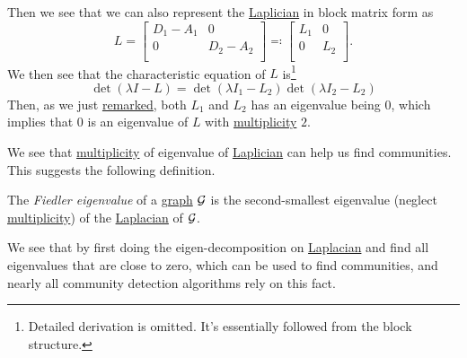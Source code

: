 Then we see that we can also represent the \hyperref[def:Laplician]{Laplician} in block matrix form as
\[
	L = \begin{bmatrix}
		D_{1} - A_{1} & 0         \\
		0             & D_2 - A_2 \\
	\end{bmatrix} \eqqcolon \begin{bmatrix}
		L_{1} & 0   \\
		0     & L_2 \\
	\end{bmatrix}.
\]
We then see that the characteristic equation of \(L\) is\footnote{Detailed derivation is omitted. It's essentially followed from the block structure.}
\[
	\det(\lambda I - L) = \det(\lambda I_1 - L_2)\det(\lambda  I_2 - L_2)
\]
Then, as we just \hyperref[rmk:Laplacian]{remarked}, both \(L_1\) and \(L_2\) has an eigenvalue being \(0\), which implies that \(0\) is an eigenvalue of \(L\) with
\hyperref[def:multiplicity]{multiplicity} \(2\).

We see that \hyperref[def:multiplicity]{multiplicity} of eigenvalue of \hyperref[def:Laplician]{Laplician} can help us find communities.
This suggests the following definition.

\begin{definition}\label{def:Filder-eigenvalue}
	The \emph{Fiedler eigenvalue} of a \hyperref[def:graph]{graph} \(\mathcal{\MakeUppercase{g}}\) is the second-smallest eigenvalue
	(neglect \hyperref[def:multiplicity]{multiplicity}) of the \hyperref[def:Laplician]{Laplacian} of \(\mathcal{\MakeUppercase{g}}\).
\end{definition}

We see that by first doing the eigen-decomposition on \hyperref[def:Laplician]{Laplacian} and find all eigenvalues that are close to zero, which can be
used to find communities, and nearly all community detection algorithms rely on this fact.

